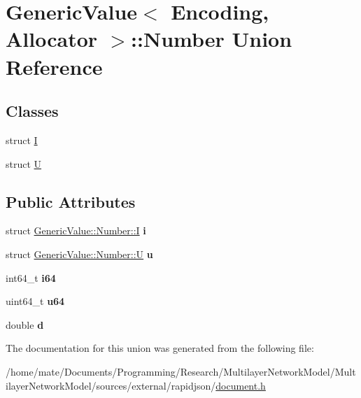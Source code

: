 \hypertarget{unionGenericValue_1_1Number}{}\section{Generic\+Value$<$ Encoding, Allocator $>$\+:\+:Number Union Reference}
\label{unionGenericValue_1_1Number}
\subsection*{Classes}
\begin{DoxyCompactItemize}
\item 
struct \hyperlink{structGenericValue_1_1Number_1_1I}{I}
\item 
struct \hyperlink{structGenericValue_1_1Number_1_1U}{U}
\end{DoxyCompactItemize}
\subsection*{Public Attributes}
\begin{DoxyCompactItemize}
\item 
struct \hyperlink{structGenericValue_1_1Number_1_1I}{Generic\+Value\+::\+Number\+::I} {\bfseries i}\hypertarget{unionGenericValue_1_1Number_a0593fffc72a240979606668179e94436}{}\label{unionGenericValue_1_1Number_a0593fffc72a240979606668179e94436}

\item 
struct \hyperlink{structGenericValue_1_1Number_1_1U}{Generic\+Value\+::\+Number\+::U} {\bfseries u}\hypertarget{unionGenericValue_1_1Number_a3b5f0986718c830b88d641491248131d}{}\label{unionGenericValue_1_1Number_a3b5f0986718c830b88d641491248131d}

\item 
int64\+\_\+t {\bfseries i64}\hypertarget{unionGenericValue_1_1Number_ae53d96a8ead92099541da3b71633b77b}{}\label{unionGenericValue_1_1Number_ae53d96a8ead92099541da3b71633b77b}

\item 
uint64\+\_\+t {\bfseries u64}\hypertarget{unionGenericValue_1_1Number_a1c8d3c6d226cf74315e233b30b622430}{}\label{unionGenericValue_1_1Number_a1c8d3c6d226cf74315e233b30b622430}

\item 
double {\bfseries d}\hypertarget{unionGenericValue_1_1Number_a7ca3ad492fff303586d241eb0d17c242}{}\label{unionGenericValue_1_1Number_a7ca3ad492fff303586d241eb0d17c242}

\end{DoxyCompactItemize}


The documentation for this union was generated from the following file\+:\begin{DoxyCompactItemize}
\item 
/home/mate/\+Documents/\+Programming/\+Research/\+Multilayer\+Network\+Model/\+Multilayer\+Network\+Model/sources/external/rapidjson/\hyperlink{document_8h}{document.\+h}\end{DoxyCompactItemize}
